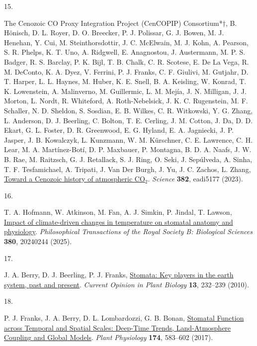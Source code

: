 \documentclass[
  letterpaper,
  DIV=11,
  numbers=noendperiod]{scrartcl}
\newlength{\cslhangindent}
\newlength{\csllabelwidth}
\newenvironment{CSLReferences}[2] %
 {\begin{list}{}{%
  \setlength{\itemindent}{0pt}
  \setlength{\leftmargin}{0pt}
  \setlength{\parsep}{0pt}
  \ifodd #1
   \setlength{\leftmargin}{\cslhangindent}
   \setlength{\itemindent}{-1\cslhangindent}
  \fi
  \setlength{\itemsep}{#2\baselineskip}}}
 {\end{list}}
\newcommand{\CSLLeftMargin}[1]{\parbox[t]{\csllabelwidth}{\strut#1\strut}}
\newcommand{\CSLRightInline}[1]{\parbox[t]{\linewidth - \csllabelwidth}{\strut#1\strut}}
\begin{document}
\begin{CSLReferences}{0}{1}
\CSLLeftMargin{15. }%
\CSLRightInline{The Cenozoic CO Proxy Integration Project (CenCOPIP)
Consortium*†, B. Hönisch, D. L. Royer, D. O. Breecker, P. J. Polissar,
G. J. Bowen, M. J. Henehan, Y. Cui, M. Steinthorsdottir, J. C. McElwain,
M. J. Kohn, A. Pearson, S. R. Phelps, K. T. Uno, A. Ridgwell, E.
Anagnostou, J. Austermann, M. P. S. Badger, R. S. Barclay, P. K. Bijl,
T. B. Chalk, C. R. Scotese, E. De La Vega, R. M. DeConto, K. A. Dyez, V.
Ferrini, P. J. Franks, C. F. Giulivi, M. Gutjahr, D. T. Harper, L. L.
Haynes, M. Huber, K. E. Snell, B. A. Keisling, W. Konrad, T. K.
Lowenstein, A. Malinverno, M. Guillermic, L. M. Mejía, J. N. Milligan,
J. J. Morton, L. Nordt, R. Whiteford, A. Roth-Nebelsick, J. K. C.
Rugenstein, M. F. Schaller, N. D. Sheldon, S. Sosdian, E. B. Wilkes, C.
R. Witkowski, Y. G. Zhang, L. Anderson, D. J. Beerling, C. Bolton, T. E.
Cerling, J. M. Cotton, J. Da, D. D. Ekart, G. L. Foster, D. R.
Greenwood, E. G. Hyland, E. A. Jagniecki, J. P. Jasper, J. B. Kowalczyk,
L. Kunzmann, W. M. Kürschner, C. E. Lawrence, C. H. Lear, M. A.
Martínez-Botí, D. P. Maxbauer, P. Montagna, B. D. A. Naafs, J. W. B.
Rae, M. Raitzsch, G. J. Retallack, S. J. Ring, O. Seki, J. Sepúlveda, A.
Sinha, T. F. Tesfamichael, A. Tripati, J. Van Der Burgh, J. Yu, J. C.
Zachos, L. Zhang, \href{https://doi.org/10.1126/science.adi5177}{Toward
a {Cenozoic} history of atmospheric {CO}\(_{\textrm{2}}\)}.
\emph{Science} \textbf{382}, eadi5177 (2023).}

\CSLLeftMargin{16. }%
\CSLRightInline{T. A. Hofmann, W. Atkinson, M. Fan, A. J. Simkin, P.
Jindal, T. Lawson, \href{https://doi.org/10.1098/rstb.2024.0244}{Impact
of climate-driven changes in temperature on stomatal anatomy and
physiology}. \emph{Philosophical Transactions of the Royal Society B:
Biological Sciences} \textbf{380}, 20240244 (2025).}

\CSLLeftMargin{17. }%
\CSLRightInline{J. A. Berry, D. J. Beerling, P. J. Franks,
\href{https://doi.org/10.1016/j.pbi.2010.04.013}{Stomata: Key players in
the earth system, past and present}. \emph{Current Opinion in Plant
Biology} \textbf{13}, 232--239 (2010).}

\CSLLeftMargin{18. }%
\CSLRightInline{P. J. Franks, J. A. Berry, D. L. Lombardozzi, G. B.
Bonan, \href{https://doi.org/10.1104/pp.17.00287}{Stomatal {Function}
across {Temporal} and {Spatial} {Scales}: {Deep}-{Time} {Trends},
{Land}-{Atmosphere} {Coupling} and {Global} {Models}}. \emph{Plant
Physiology} \textbf{174}, 583--602 (2017).}


\end{CSLReferences}
\end{document}
